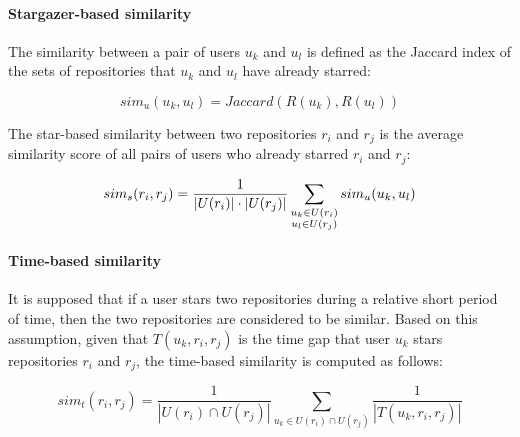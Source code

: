 
\paragraph{Stargazer-based similarity}

The similarity between a pair of users $ u_{k} $ and $ u_{l} $ is defined as the Jaccard index \cite{jaccard} of the sets of repositories that $ u_{k} $ and $ u_{l} $ have already starred:%

\begin{equation} \label{eqn:StarBasedSim}
sim_{u}(u_{k},u_{l})=Jaccard(R(u_{k}),R(u_{l}))
\end{equation}

The star-based similarity between two repositories $ r_{i} $ and $ r_{j} $ is the average similarity score of all pairs of users who already starred $ r_{i} $ and $ r_{j} $:%

\begin{equation} %
sim_{s}(r_i,r_j) = \frac{1}{|U(r_{i})|\cdot |U(r_{j})|}\sum_{\substack{u_k\in U(r_i)\\
		u_l\in U(r_j)}}sim_{u}(u_k,u_l)\\
\end{equation}


\paragraph{Time-based similarity} It is supposed that if a user stars two repositories during a relative short period of time, then the two repositories are considered to be similar. Based on this assumption, given that $T(u_{k},r_{i},r_{j})$ is the time gap that user $u_{k}$ stars repositories $r_{i}$ and $r_{j}$, the time-based similarity is computed as follows:%


\begin{equation} %
sim_{t}(r_i,r_j) = \frac{1}{|U(r_{i}) \cap U(r_{j})|}\sum_{u_k\in U(r_{i}) \cap U(r_{j})}\frac{1}{|T(u_k,r_i,r_j)|}
\end{equation}


